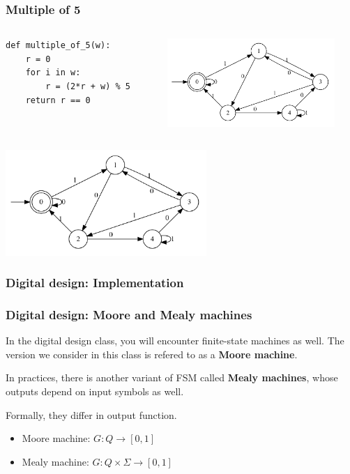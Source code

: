 \begin{frame}[fragile]
  \frametitle{Multiple of 5}

  \begin{columns}
    \begin{column}{0.5\textwidth}
      \pause
\begin{verbatim}
def multiple_of_5(w):
    r = 0
    for i in w:
        r = (2*r + w) % 5
    return r == 0
\end{verbatim}        
    \end{column}
    \begin{column}{0.5\textwidth}
      \pause
      \includegraphics[width=2.5in]{images/gv/mc02-fa-ex3.png}
    \end{column}
  \end{columns}
\end{frame}

\begin{frame}
  \includegraphics[width=3in]{images/gv/mc02-fa-ex3.png}
\end{frame}

\begin{frame}
  \frametitle{Digital design: Implementation}

\end{frame}

\begin{frame}
  \frametitle{Digital design: Moore and Mealy machines}

  In the digital design class, you will encounter finite-state
  machines as well.  The version we consider in this class is refered
  to as a {\bf Moore machine}.

  In practices, there is another variant of FSM called {\bf Mealy
    machines}, whose outputs depend on input symbols as well.

  \pause

  Formally, they differ in output function.

  \begin{itemize}
  \item Moore machine: $G:Q \longrightarrow [0,1]$
  \item Mealy machine: $G:Q\times \Sigma \longrightarrow [0,1]$
  \end{itemize}
  
\end{frame}

